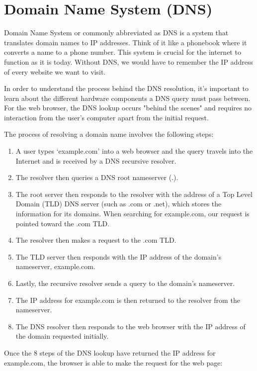 \documentclass[12pt,titlepage]{article}
\begin{document}
\section{Domain Name System (DNS)}
Domain Name System or commonly abbreviated as DNS is a system that translates domain names to IP addresses.
Think of it like a phonebook where it converts a name to a phone number. This system is crucial for the internet
to function as it is today. Without DNS, we would have to remember the IP address of every website we want to visit.

In order to understand the process behind the DNS resolution, it’s important to learn about
the different hardware components a DNS query must pass between. For the web browser, the DNS
lookup occurs "behind the scenes" and requires no interaction from the user’s computer apart from
the initial request.

The process of resolving a domain name involves the following steps:
\begin{enumerate}
    \item {
        A user types ‘example.com’ into a web browser and the query travels into the Internet and is received by a DNS recursive resolver.
    }
    \item {
        The resolver then queries a DNS root nameserver (.).
    }
    \item {
        The root server then responds to the resolver with the address of a Top Level Domain (TLD) DNS
        server (such as .com or .net), which stores the information for its domains. When searching for
        example.com, our request is pointed toward the .com TLD.
    }
    \item {
        The resolver then makes a request to the .com TLD.
    }
    \item {
        The TLD server then responds with the IP address of the domain’s nameserver, example.com.
    }
    \item {
        Lastly, the recursive resolver sends a query to the domain’s nameserver.
    }
    \item {
        The IP address for example.com is then returned to the resolver from the nameserver.
    }
    \item {
        The DNS resolver then responds to the web browser with the IP address of the domain requested initially.
    }
\end{enumerate}

Once the 8 steps of the DNS lookup have returned the IP address for example.com, the browser is able to make the request for the web page:
\end{document}
